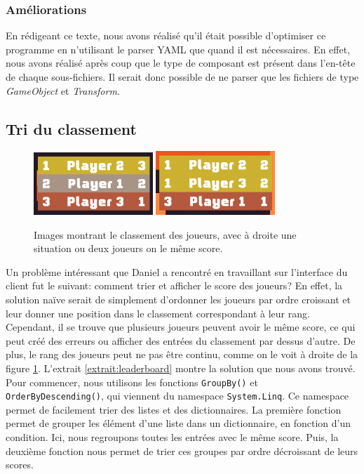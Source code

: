 \documentclass[a4paper]{article}
\begin{document}
\subsubsection{Améliorations}
En rédigeant ce texte, nous avons réalisé qu'il était possible d'optimiser ce programme en n'utilisant le parser YAML que quand il est nécessaires. En effet, nous avons réalisé après coup que le type de composant est présent dans l'en-tête de chaque sous-fichiers. Il serait donc possible de ne parser que les fichiers de type \textit{GameObject} et \textit{Transform}.

\subsection{Tri du classement}
\begin{figure}[H]
	\centering
    \includegraphics[width=0.4\textwidth]{images/game/leaderboard1.png}
    \includegraphics[width=0.4\textwidth]{images/game/leaderboard2.png}
    \caption{Images montrant le classement des joueurs, avec à droite une situation ou deux joueurs on le même score.}
    \label{fig:leaderboard}
\end{figure}
Un problème intéressant que Daniel a rencontré en travaillant sur l'interface du client fut le suivant: comment trier et afficher le score des joueurs? En effet, la solution naïve serait de simplement d'ordonner les joueurs par ordre croissant et leur donner une position dans le classement correspondant à leur rang. Cependant, il se trouve que plusieurs joueurs peuvent avoir le même score, ce qui peut créé des erreurs ou afficher des entrées du classement par dessus d'autre. De plus, le rang des joueurs peut ne pas être continu, comme on le voit à droite de la figure \ref{fig:leaderboard}. L'extrait \ref{extrait:leaderboard} montre la solution que nous avons trouvé. \\
Pour commencer, nous utilisons les fonctions \texttt{GroupBy()} et \texttt{OrderByDescending()}, qui viennent du namespace\cite{namespace} \texttt{System.Linq}. Ce namespace permet  de facilement trier des listes et des dictionnaires. La première fonction permet de grouper les élément d'une liste dans un dictionnaire, en fonction d'un condition. Ici, nous regroupons toutes les entrées avec le même score. Puis, la deuxième fonction nous permet de trier ces groupes par ordre décroissant de leurs scores.  \\
\end{document}
